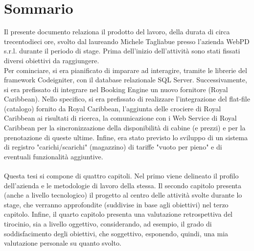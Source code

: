
\cleardoublepage
{}
{}
\begingroup
\let\clearpage\relax
\let\cleardoublepage\relax
\let\cleardoublepage\relax

\chapter*{Sommario}

Il presente documento relaziona il prodotto del lavoro, della durata di circa trecentodieci ore, svolto dal laureando Michele Tagliabue presso l'azienda WebPD s.r.l. durante il periodo di stage. Prima dell'inizio dell'attività sono stati fissati diversi obiettivi da raggiungere.\\
Per cominciare, si era pianificato di imparare ad interagire, tramite le librerie del framework Codeigniter, con il database relazionale SQL Server. 
Successivamente, si era prefissato di integrare nel Booking Engine un nuovo fornitore (Royal Caribbean). Nello specifico, si era prefissato di realizzare l'integrazione del flat-file (catalogo) fornito da Royal Caribbean, l'aggiunta delle crociere di Royal Caribbean ai risultati di ricerca, la comunicazione con i Web Service di Royal Caribbean per la sincronizzazione della disponibilità di cabine (e prezzi) e per la prenotazione di queste ultime.
Infine, era stato previsto lo sviluppo di un sistema di registro "carichi/scarichi" (magazzino) di tariffe "vuoto per pieno" e di eventuali funzionalità aggiuntive.\\ \\
Questa tesi si compone di quattro capitoli. Nel primo viene delineato il profilo dell'azienda e le metodologie di lavoro della stessa. Il secondo capitolo presenta (anche a livello tecnologico) il progetto al centro delle attività svolte durante lo stage, che verranno approfondite (suddivise in base agli obiettivi) nel terzo capitolo. Infine, il quarto capitolo presenta una valutazione retrospettiva del tirocinio, sia a livello oggettivo, considerando, ad esempio, il grado di soddisfacimento degli obiettivi, che soggettivo, esponendo, quindi, una mia valutazione personale su quanto svolto.

%
%

\endgroup			

\vfill

